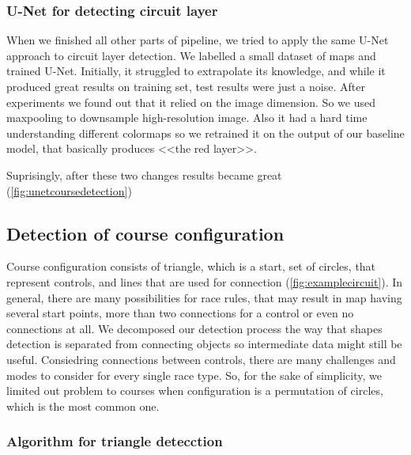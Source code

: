 \documentclass[a4paper,12pt]{extarticle}
\begin{document}
\subsubsection{U-Net for detecting circuit layer}

When we finished all other parts of pipeline, we tried to apply the same U-Net approach to circuit layer detection.
We labelled a small dataset of maps and trained U-Net.
Initially, it struggled to extrapolate its knowledge, and while it produced great results on training set, test results were just a noise.
After experiments we found out that it relied on the image dimension. So we used maxpooling to downsample high-resolution image.
Also it had a hard time understanding different colormaps so we retrained it on the output of our baseline model, that basically produces <<the red layer>>. 

Suprisingly, after these two changes results became great (\cref{fig:unetcoursedetection})

\subsection{Detection of course configuration}

Course configuration consists of triangle, which is a start, set of circles, that represent controls, and lines that are used for connection (\cref{fig:examplecircuit}).
In general, there are many possibilities for race rules, that may result in map having several start points, more than two connections for a control or even no connections at all.
We decomposed our detection process the way that shapes detection is separated from connecting objects so intermediate data might still be useful.
Consiedring connections between controls, there are many challenges and modes to consider for every single race type.
So, for the sake of simplicity, we limited out problem to courses when  configuration is a permutation of circles, which is the most common one.

\subsubsection{Algorithm for triangle detecction}
\end{document}
